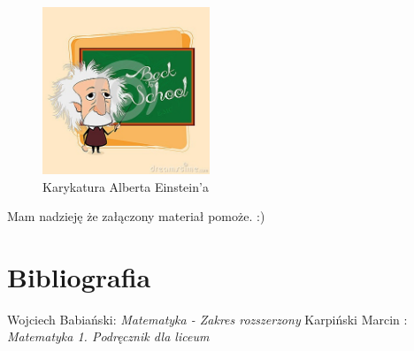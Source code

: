 \documentclass[12pt,a4paper]{article}
\begin{document}
\begin{figure}
\centering
\includegraphics[width=5cm]{einstein}
\caption{Karykatura Alberta Einstein'a}
\label{fig:obrazek troj}
\end{figure}

\center Mam nadzieję że załączony materiał pomoże.
\center :)


\newpage

\section{Bibliografia}

\begin{thebibliography}{9}
Wojciech Babiański: \emph{Matematyka - Zakres rozszerzony}
Karpiński Marcin : \emph{Matematyka 1. Podręcznik dla liceum}

\end{thebibliography}
\end{document}
